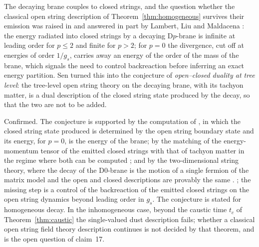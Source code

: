 The decaying brane couples to closed strings, and the question whether the classical open string description of Theorem~\ref{thm:homogeneous} survives their emission was raised in \cite{Sen02rolling} and answered in part by Lambert, Liu and Maldacena \cite{LLM07}: the energy radiated into closed strings by a decaying D$p$-brane is infinite at leading order for $p\le2$ and finite for $p>2$; for $p=0$ the divergence, cut off at energies of order $1/g_s$, carries away an energy of the order of the mass of the brane, which signals the need to control backreaction before inferring an exact energy partition. Sen \cite{Sen03openclosed} turned this into the conjecture of \emph{open--closed duality at tree level}: the tree-level open string theory on the decaying brane, with its tachyon matter, is a dual description of the closed string state produced by the decay, so that the two are not to be added.

\begin{verdict}[claim 18]
Confirmed. The conjecture is supported by the computation of \cite{LLM07}, in which the closed string state produced is determined by the open string boundary state and its energy, for $p=0$, is the energy of the brane; by the matching of the energy-momentum tensor of the emitted closed strings with that of tachyon matter in the regime where both can be computed \cite{Sen03openclosed}; and by the two-dimensional string theory, where the decay of the D0-brane is the motion of a single fermion of the matrix model and the open and closed descriptions are provably the same \cite{Sen04review}. ; the missing step is a control of the backreaction of the emitted closed strings on the open string dynamics beyond leading order in $g_s$. The conjecture is stated for homogeneous decay. In the inhomogeneous case, beyond the caustic time $t_c$ of Theorem~\ref{thm:caustic} the single-valued dust description fails; whether a classical open string field theory description continues is not decided by that theorem, and is the open question of claim~17.
\end{verdict}
